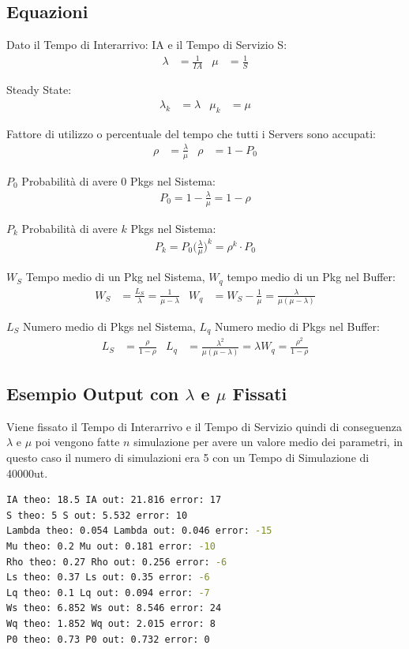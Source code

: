 \documentclass[12pt,a4paper]{article}
\begin{document}
\subsection{Equazioni}
Dato il Tempo di Interarrivo: IA e il Tempo di Servizio S:
\begin{align*}
\lambda  &= \frac{1}{IA} & 
\mu &= \frac{1}{S}
\end{align*}

Steady State:
\begin{align*}
\lambda_k &= \lambda & 
\mu_k &= \mu
\end{align*}

Fattore di utilizzo o percentuale del tempo che tutti i Servers sono accupati: 
\begin{align*}
\rho &= \frac{\lambda}{\mu} & 
\rho &= 1 - P_0
\end{align*}

$P_0$ Probabilità di avere $0$ Pkgs nel Sistema:
\begin{align*}
P_0 = 1 - \frac{\lambda}{\mu} = 1 - \rho
\end{align*}

$P_k$ Probabilità di avere $k$ Pkgs nel Sistema:
\begin{align*}
P_k = P_0 \bigg(\frac{\lambda}{\mu}\bigg)^k = \rho^k \cdot P_0
\end{align*}

$W_S$ Tempo medio di un Pkg nel Sistema, $W_q$ tempo medio di un Pkg nel Buffer:
\begin{align*}
W_S &= \frac{L_S}{\lambda} = \frac{1}{\mu - \lambda} &
W_q &= W_S - \frac{1}{\mu} = \frac{\lambda}{\mu(\mu - \lambda)}
\end{align*}

$L_S$ Numero medio di Pkgs nel Sistema, $L_q$ Numero medio di Pkgs nel Buffer:
\begin{align*}
L_S &= \frac{\rho}{1 - \rho} &
L_q &= \frac{\lambda^2}{\mu(\mu - \lambda)} = \lambda W_q = \frac{\rho^2}{1 - \rho}
\end{align*}


\subsection{Esempio Output con $\lambda$ e $\mu$ Fissati}
Viene fissato il Tempo di Interarrivo e il Tempo di Servizio quindi di conseguenza $\lambda$ e 
$\mu$ poi vengono fatte $n$ simulazione per avere un valore medio dei parametri, in questo caso il numero di simulazioni era 5 con un Tempo di Simulazione di 40000ut. 
\bigbreak
\begin{lstlisting}[language=bash, caption=Output Parameters Sample]
IA theo: 18.5 IA out: 21.816 error: 17
S theo: 5 S out: 5.532 error: 10
Lambda theo: 0.054 Lambda out: 0.046 error: -15
Mu theo: 0.2 Mu out: 0.181 error: -10
Rho theo: 0.27 Rho out: 0.256 error: -6
Ls theo: 0.37 Ls out: 0.35 error: -6
Lq theo: 0.1 Lq out: 0.094 error: -7
Ws theo: 6.852 Ws out: 8.546 error: 24
Wq theo: 1.852 Wq out: 2.015 error: 8
P0 theo: 0.73 P0 out: 0.732 error: 0
\end{lstlisting}
\end{document}

